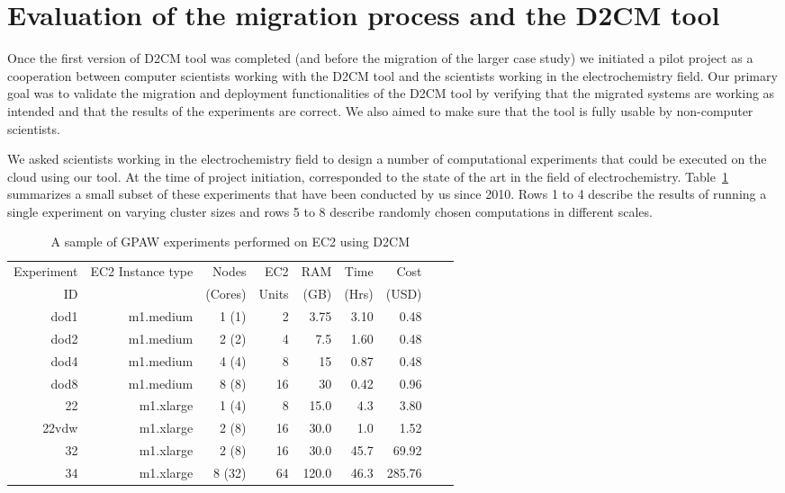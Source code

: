 \documentclass[a4paper,10pt]{article}
\begin{document}
\section{Evaluation of the migration process and the D2CM tool}

Once the first version of D2CM tool was completed (and before the migration of the larger case study) we initiated a pilot project as a cooperation between computer scientists working with the D2CM tool and the scientists working in the electrochemistry field. Our primary goal was to validate the migration and deployment functionalities of the D2CM tool by verifying that the migrated systems are working as intended and that the results of the experiments are correct. We also aimed to make sure that the tool is fully usable by non-computer scientists. 

We asked scientists working in the electrochemistry field to design a number of computational experiments that could be executed on the cloud using our tool. At the time of project initiation, corresponded to the state of the art in the field of electrochemistry. Table~\ref{tab:GPAW_EC2} summarizes a small subset of these experiments that have been conducted by us since 2010. Rows 1 to 4 describe the results of running a single experiment on varying cluster sizes and rows 5 to 8 describe randomly chosen computations in different scales. 

\begin{table}
\begin{center}
\begin{tabular}{ r r r r r r r r r  }
\hline
Experiment	& EC2 Instance type 	& Nodes   	& EC2		& RAM 		& Time  	& Cost  \\
ID		&		& (Cores) 	& Units		& (GB) 		& (Hrs) 	& (USD) \\\hline
dod1		& m1.medium	& 1 (1)		& 2		& 3.75		& 3.10		& 0.48\\
dod2		& m1.medium	& 2 (2)		& 4		& 7.5		& 1.60		& 0.48\\
dod4		& m1.medium	& 4 (4)		& 8		& 15		& 0.87		& 0.48\\
dod8		& m1.medium	& 8 (8)		& 16		& 30		& 0.42		& 0.96\\
22 		& m1.xlarge	& 1 (4)		& 8		& 15.0		& 4.3		& 3.80 	\\
22vdw 		& m1.xlarge	& 2 (8)		& 16		& 30.0		& 1.0		& 1.52 	\\
32 		& m1.xlarge	& 2 (8)		& 16		& 30.0		& 45.7		& 69.92 \\
34 		& m1.xlarge	& 8 (32)	& 64		& 120.0		& 46.3		& 285.76\\
\end{tabular}
\end{center}
  \caption{A sample of GPAW experiments performed on EC2 using D2CM}
  \label{tab:GPAW_EC2}
\end{table}
\end{document}
